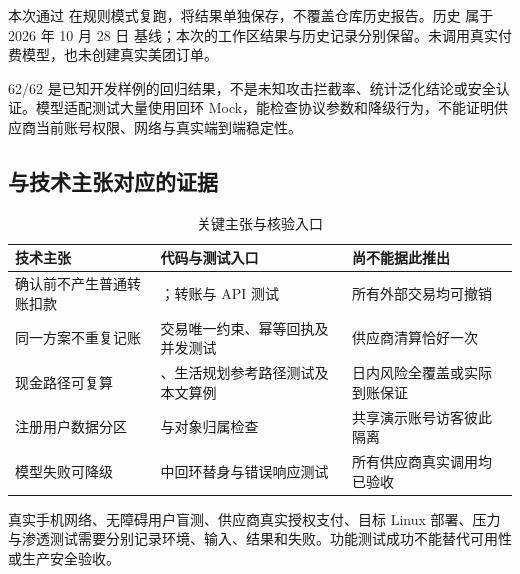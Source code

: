 本次通过  在规则模式复跑，将结果单独保存，不覆盖仓库历史报告。历史  属于 2026 年 10 月 28 日  基线；本次的工作区结果与历史记录分别保留。未调用真实付费模型，也未创建真实美团订单。

62/62 是已知开发样例的回归结果，不是未知攻击拦截率、统计泛化结论或安全认证。模型适配测试大量使用回环 Mock，能检查协议参数和降级行为，不能证明供应商当前账号权限、网络与真实端到端稳定性。

\subsection{与技术主张对应的证据}
\begin{table}[htbp]\centering\small
\caption{关键主张与核验入口}
\begin{tabularx}{\textwidth}{@{}L{3cm}YY@{}}\toprule
技术主张 & 代码与测试入口 & 尚不能据此推出 \\\midrule
确认前不产生普通转账扣款 & ；转账与 API 测试 & 所有外部交易均可撤销 \\
同一方案不重复记账 & 交易唯一约束、幂等回执及并发测试 & 供应商清算恰好一次 \\
现金路径可复算 & 、生活规划参考路径测试及本文算例 & 日内风险全覆盖或实际到账保证 \\
注册用户数据分区 &  与对象归属检查 & 共享演示账号访客彼此隔离 \\
模型失败可降级 &  中回环替身与错误响应测试 & 所有供应商真实调用均已验收 \\\bottomrule
\end{tabularx}
\end{table}

真实手机网络、无障碍用户盲测、供应商真实授权支付、目标 Linux 部署、压力与渗透测试需要分别记录环境、输入、结果和失败。功能测试成功不能替代可用性或生产安全验收。
